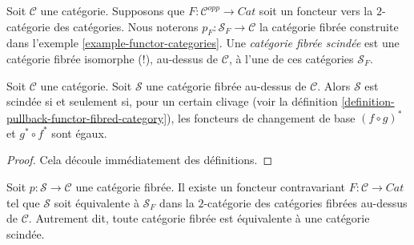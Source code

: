 \begin{definition}
\label{definition-split-fibred-category}
Soit $\mathcal{C}$ une catégorie.
Supposons que $F : \mathcal{C}^{opp} \to \textit{Cat}$ soit un foncteur
vers la $2$-catégorie des catégories.
Nous noterons $p_F : \mathcal{S}_F \to \mathcal{C}$ la
catégorie fibrée construite dans
l'exemple \ref{example-functor-categories}.
Une {\it catégorie fibrée scindée} est une catégorie fibrée isomorphe (!),
au-dessus de $\mathcal{C}$, à l'une de ces catégories {\it $\mathcal{S}_F$}.
\end{definition}

\begin{lemma}
\label{lemma-when-split}
Soit $\mathcal{C}$ une catégorie.
Soit $\mathcal{S}$ une catégorie fibrée au-dessus de $\mathcal{C}$.
Alors $\mathcal{S}$ est scindée si et seulement si, pour un certain clivage
(voir la définition \ref{definition-pullback-functor-fibred-category}),
les foncteurs de changement de base
$(f \circ g)^*$ et $g^* \circ f^*$ sont égaux.
\end{lemma}

\begin{proof}
Cela découle immédiatement des définitions.
\end{proof}

\begin{lemma}
\label{lemma-fibred-strict}
Soit $ p : \mathcal{S} \to \mathcal{C}$ une catégorie fibrée.
Il existe un foncteur contravariant $F : \mathcal{C} \to \textit{Cat}$
tel que $\mathcal{S}$ soit équivalente à $\mathcal{S}_F$
dans la $2$-catégorie des catégories fibrées au-dessus de $\mathcal{C}$. Autrement
dit, toute catégorie fibrée est équivalente à une catégorie scindée.
\end{lemma}


